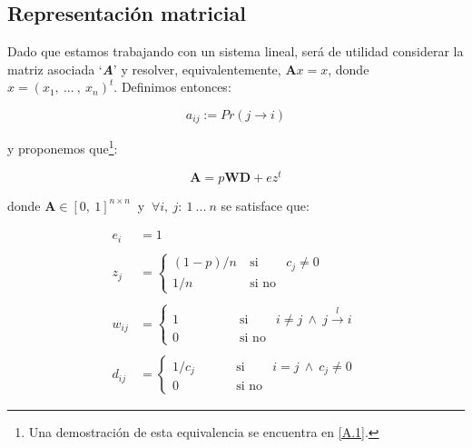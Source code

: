 \vspace{2em}
\subsection{Representación matricial} Dado que estamos trabajando con un sistema lineal, será de utilidad considerar la matriz asociada `\textbf{\textit{A}}' y resolver, equivalentemente, $\textbf{A}x = x$, donde $x = (x_1,\ ...\ ,\ x_n)^t$. Definimos entonces:

\begin{equation}
    a_{ij} := Pr(j \longrightarrow i)
\end{equation}

\vspace{1em}
\noindent y proponemos que\footnote{Una demostración de esta equivalencia se encuentra en \ref{A.1}.}:

\begin{equation}\label{E.1}
    \textbf{A} = p\textbf{W}\textbf{D} + ez^t
\end{equation}

\vspace{1em}
\noindent donde $\textbf{A} \in [0,\ 1]^{n \times n}\ $ y $\ \forall i,\ j:\ 1\ ...\ n$ se satisface que:

\begin{align*}
    e_i     &=  1
    \\
    \\
    z_{j}   &=  \left\{ 
                    \begin{array}{lcc}
                    (1 - p) / n     &  \: \text{si}    &  c_j \neq 0 \\
                    1 / n           &  \: \text{si no} &
                    \end{array}
                \right.\
    \\
    \\
    w_{ij}  &=  \left\{ 
                    \begin{array}{lcc}
                    1               &  \qquad \qquad \text{si}    & i \neq j\  \wedge\ j \stackrel{l}{\longrightarrow} i \\
                    0               &  \qquad \qquad \text{si no} &
                    \end{array}
                \right.\
    \\
    \\
    d_{ij}  &=  \left\{ 
                    \begin{array}{lcc}
                    1 / c_j         &  \qquad \: \: \text{si}    & i = j\  \wedge\ c_j \neq 0 \\
                    0               &  \qquad \ \  \text{si no} &
                    \end{array}
                \right.\
\end{align*}
\vspace{1em}

